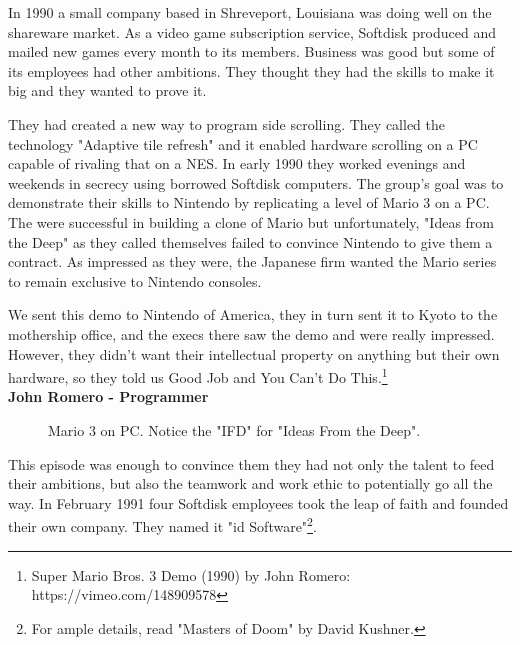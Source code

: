 \documentclass[book.tex]{subfiles}
\begin{document}
In 1990 a small company based in Shreveport, Louisiana was doing well on the shareware market. As a video game subscription service, Softdisk produced and mailed new games every month to its members. Business was good but some of its employees had other ambitions. They thought they had the skills to make it big and they wanted to prove it.\\
\par
They had created a new way to program side scrolling. They called the technology "Adaptive tile refresh" and it enabled hardware scrolling on a PC capable of rivaling that on a NES. In early 1990 they worked evenings and weekends in secrecy using borrowed Softdisk computers. The group's goal was to demonstrate their skills to Nintendo by replicating a level of Mario 3 on a PC. The were successful in building a clone of Mario  but unfortunately, "Ideas from the Deep" as they called themselves failed to convince Nintendo to give them a contract. As impressed as they were, the Japanese firm wanted the Mario series to remain exclusive to Nintendo consoles.\\
\par
\begin{fancyquotes}
We sent this demo to Nintendo of America, they in turn sent it to Kyoto to the mothership office, and the execs there saw the demo and were really impressed. However, they didn't want their intellectual property on anything but their own hardware, so they told us Good Job and You Can't Do This.\footnote{Super Mario Bros. 3 Demo (1990) by John Romero: https://vimeo.com/148909578}
 \bigskip \\
\textbf{John Romero - Programmer}
 \end{fancyquotes}

 \begin{figure}[H]
\caption{Mario 3 on PC. Notice the "IFD" for "Ideas From the Deep".}
\end{figure}

\par
This episode was enough to convince them they had not only the talent to feed their ambitions, but also the teamwork and work ethic to potentially go all the way. In February 1991 four Softdisk employees took the leap of faith and founded their own company. They named it "id Software"\footnote{For ample details, read "Masters of Doom" by David Kushner.}. 
\end{document}
